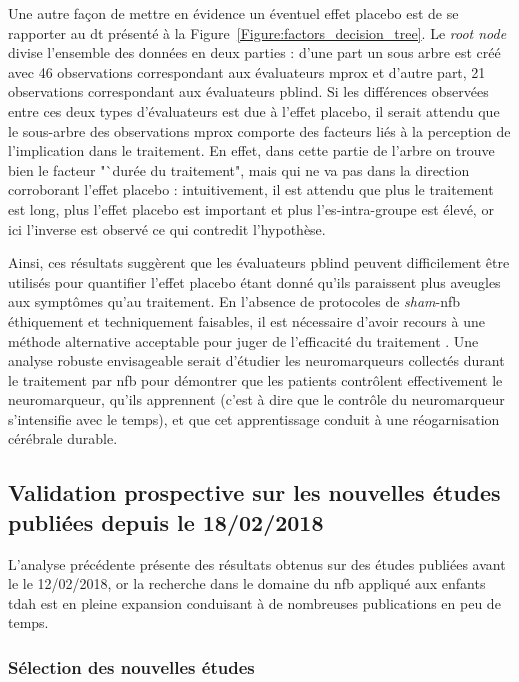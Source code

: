 Une autre façon de mettre en évidence un éventuel effet placebo est de se rapporter au \gls{dt} présenté à la Figure~\ref{Figure:factors_decision_tree}. Le 
\textit{root node} divise l'ensemble des données en deux parties : d'une part un sous arbre est créé avec 46 observations correspondant aux évaluateurs
\gls{mprox} et d'autre part, 21 observations correspondant aux évaluateurs \gls{pblind}. Si les différences observées entre ces deux types d'évaluateurs est due à l'effet
placebo, il serait attendu que le sous-arbre des observations \gls{mprox} comporte des facteurs liés à la perception de l'implication dans le traitement. En effet, dans cette
partie de l'arbre on trouve bien le facteur "`durée du traitement", mais qui ne va pas dans la direction corroborant l'effet placebo : intuitivement, 
il est attendu que plus le traitement est long, plus l'effet placebo est important et plus l'\gls{es}-intra-groupe est élevé, or ici l'inverse est observé ce qui
contredit l'hypothèse. 

Ainsi, ces résultats suggèrent que les évaluateurs \gls{pblind} peuvent difficilement être utilisés pour quantifier l'effet placebo étant donné qu'ils paraissent
plus aveugles aux symptômes qu'au traitement. En l'absence de protocoles de \textit{sham}-\gls{nfb} éthiquement \citep{Holtmann2014} et techniquement \citep{Birbaumer1991} 
faisables, il est nécessaire d'avoir recours à une méthode alternative acceptable pour juger de l'efficacité du traitement \citep{World-Medical-Association2000}. Une analyse robuste envisageable 
serait d'étudier les neuromarqueurs collectés durant le traitement par \gls{nfb} pour démontrer que les patients contrôlent effectivement le neuromarqueur, qu'ils 
apprennent (c'est à dire que le contrôle du neuromarqueur s'intensifie avec le temps), et que cet apprentissage conduit à une réogarnisation cérébrale durable. 

\subsection{Validation prospective sur les nouvelles études publiées depuis le 18/02/2018}

L'analyse précédente présente des résultats obtenus sur des études publiées avant le le 12/02/2018, or la recherche dans le domaine du \gls{nfb} appliqué aux enfants \gls{tdah} est
en pleine expansion conduisant à de nombreuses publications en peu de temps.

\subsubsection{Sélection des nouvelles études} 

